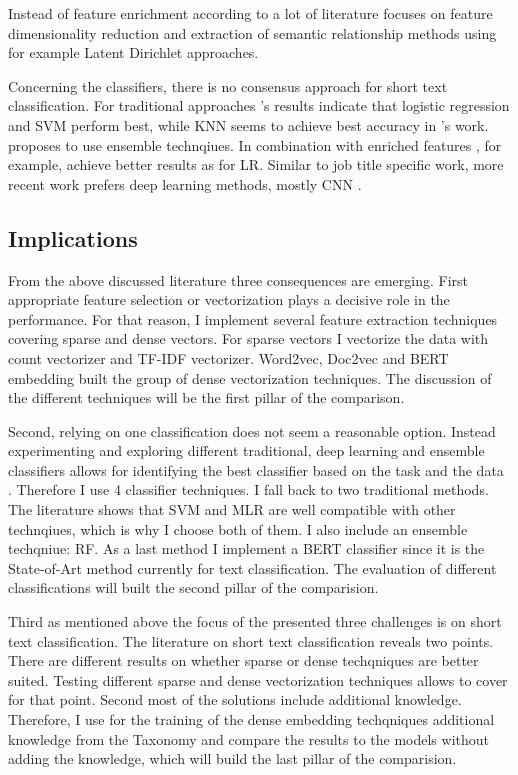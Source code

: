 \documentclass[12pt, a4paper, titlepage]{article}
\begin{document}
Instead of feature enrichment according to \citet{Song2014} a lot of literature focuses on feature dimensionality reduction and extraction of semantic relationship methods using for example Latent Dirichlet approaches. %

Concerning the classifiers, there is no consensus approach for short text classification. For traditional approaches \cite{WangY2017}'s results indicate that logistic regression and SVM perform best, while KNN seems to achieve best accuracy in \cite{Khamar2013}'s work. \citet{Song2014} proposes  to use ensemble technqiues. In combination with enriched features \citet{Bouaziz2014}, for example, achieve better results as for \ac{LR}. Similar to job title specific work, more recent work prefers deep learning methods, mostly CNN \citep{Chen2019}. 


\subsection{Implications}
From the above discussed literature three consequences are emerging. First appropriate feature selection or vectorization plays a decisive role in the performance. For that reason, I implement several feature extraction techniques covering sparse and dense vectors. For sparse vectors I vectorize the data with count vectorizer and \ac{TF-IDF} vectorizer. Word2vec, Doc2vec and \ac{BERT} embedding built the group of dense vectorization techniques. The discussion of the different techniques will be the first pillar of the comparison. 

Second, relying on one classification does not seem a reasonable option.  Instead experimenting and exploring different traditional, deep learning and ensemble classifiers allows for identifying the best classifier based on the task and the data \citep{maglogiannis2007}. Therefore I use 4 classifier techniques. I fall back to two traditional methods. The literature shows that \ac{SVM} and \ac{MLR} are well compatible with other technqiues, which is why I choose both of them. I also include an ensemble techqniue: \ac{RF}. As a last method I implement a \ac{BERT} classifier since it is the State-of-Art method currently for text classification. The evaluation of different classifications will built the second pillar of the comparision. 

Third as mentioned above the focus of the presented three challenges is on short text classification. The literature on short text classification reveals two points. There are different results on whether sparse or dense techqniques are better suited. Testing different sparse and dense vectorization techniques allows to cover for that point. Second most of the solutions include additional knowledge. Therefore, I use for the training of the dense embedding techqniques additional knowledge from the Taxonomy and compare the results to the models without adding the knowledge, which will build the last pillar of the comparision. 
\end{document}
